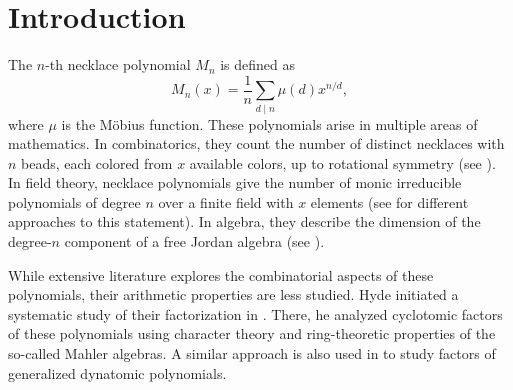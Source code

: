 \documentclass[12t,a4paper]{amsart}
\theoremstyle{definition}
\numberwithin{equation}{section}
\begin{document}
\maketitle
\tableofcontents

\section{Introduction}
The $n$-th necklace polynomial $M_n$ is defined as 
\[ M_n(x)=\frac{1}{n} \sum_{d \mid n} \mu(d)x^{n/{d}},\]
where $\mu$ is the Möbius function. These polynomials arise in multiple areas of mathematics. In combinatorics, they count the number of distinct necklaces with $n$ beads, each colored from $x$ available colors, up to rotational symmetry (see \cite{moreau1872permutations}). In field theory, necklace polynomials give the number of monic irreducible polynomials of degree $n$ over a finite field with $x$ elements (see \cite{chebolu2011counting, ireland1990classical} for different approaches to this statement). In algebra, they describe the dimension of the degree-$n$ component of a free Jordan algebra (see \cite{metropolis1983witt}).

While extensive literature explores the combinatorial aspects of these polynomials, their arithmetic properties are less studied. Hyde initiated a systematic study of their factorization in \cite{hyde2022cyclotomic}. There, he analyzed cyclotomic factors of these polynomials using character theory and ring-theoretic properties of the so-called Mahler algebras. A similar approach is also used in \cite{Dynatomic2022} to study factors of generalized dynatomic polynomials. 
\end{document}
